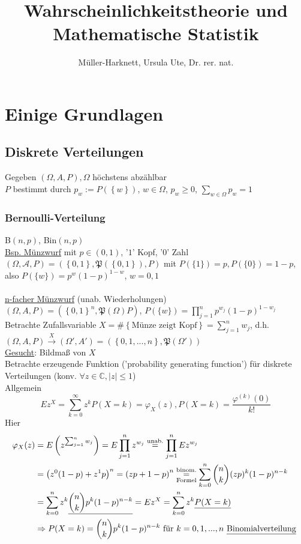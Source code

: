 \documentclass[a4paper,openany]{book}
\title{Wahrscheinlichkeitstheorie und \\ Mathematische Statistik}
\author{Müller-Harknett, Ursula Ute, Dr. rer. nat.}
\date{}
\theoremstyle{mytheoremstyle}
\theoremstyle{mytheoremstyle2}
\begin{document}
\maketitle
\tableofcontents
\chapter{Einige Grundlagen}
\section{Diskrete Verteilungen}
Gegeben $(\Omega ,A,P), \Omega$ höchstens abzählbar\\
$P$ bestimmt durch $p_w:=P(\left\{w\right\})$, $w \in \Omega$, $p_w \geq 0$, $\sum\limits_{w\in \Omega }p_w=1$ \\
\subsection{Bernoulli-Verteilung} B$(n,p)$, Bin$(n,p)$  \\
 \underline{Bsp. Münzwurf} mit $p \in (0,1)$, '$1$' Kopf, '$0$' Zahl\\
$(\Omega ,\mathcal{A},P)=\left(\left\{0,1\right\},\mathfrak{P}(\left\{0,1\right\}),P\right)$ mit $P(\{1\})=p, P(\{0\})=1-p$, also $P(\{w\})=p^w(1-p)^{1-w}$, $w=0,1$  \\\\
    \underline{n-facher Münzwurf} (unab. Wiederholungen) \\
$(\Omega ,A,P)=\left(\left\{0,1\right\}^n,\mathfrak{P}(\Omega )P\right)$, $P(\{w\})=\prod\limits_{j=1}^{n}{p^{w_j}(1-p)^{1-w_j}}$ \\ 
Betrachte Zufallsvariable $X=\#\left\{\text{Münze zeigt Kopf}\right\}=\sum\limits_{j=1}^{n}{w_j}$, d.h.
$(\Omega ,A,P)\overset{X}\to (\Omega',A')=\left(\left\{0,1,...,n\right\},\mathfrak{P}(\Omega')\right)$  \\
\underline{Gesucht}: Bildmaß von $X$ \\
Betrachte erzeugende Funktion ('probability generating function') für diskrete \\
Verteilungen (konv. $\forall z \in \mathbb{C},|z| \leq 1$) \\
Allgemein \[
  Ez^X=\sum_{k=0}^{\infty}{z^kP(X=k)}=\varphi_X (z),P(X=k)=\frac{\varphi ^{(k)}(0)}{k!}
\]
Hier 
\begin{align*}
  \varphi _X(z)&=E \left(z^{\sum_{j=1}^{n}{w_j}}\right)=E \prod_{j=1}^{n}{z^{w_j}}\overset{\text{unab.}}=\prod_{j=1}^{n}{Ez^{w_j}}\\
               &=\left(z^0(1-p)+z^1p\right)^n=\left(zp+1-p\right)^n \overset{\text{binom.}}{\underset{\text{Formel}}{=}}\sum_{k=0}^{n}{\binom{n}{k}(zp)^k(1-p)^{n-k}}\\
               &=\sum_{k=0}^{n}{z^k \underline{\binom{n}{k}p^k(1-p)^{n-k}}}=Ez^X=\sum_{k=0}^{n}{z^k \underline{P(X=k)}}\\
               &\Rightarrow P(X=k)=\binom{n}{k}p^k(1-p)^{n-k}\text{ für } k = 0,1,...,n \text{\  \underline{Binomialverteilung}
}\end{align*}
\end{document}
